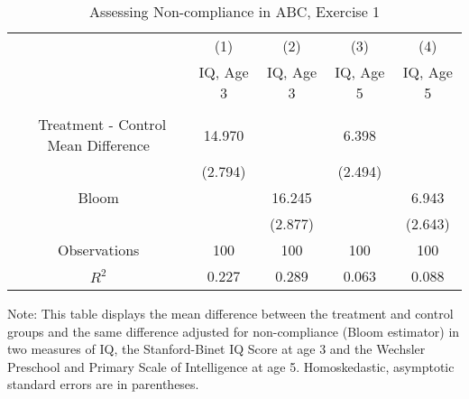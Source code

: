 \begin{table}[H] 
\begin{threeparttable}
\caption{Assessing Non-compliance in ABC, Exercise 1}
\label{table:nc1}
\centering 
\begin{tabular}{ccccc} \toprule
 & (1) & (2) & (3) & (4) \\
 & IQ, Age 3 & IQ, Age 3  & IQ, Age 5 & IQ, Age 5 \\ \midrule
 &  &  & & \\\
Treatment - Control Mean Difference & 14.970 &  & 6.398 &  \\
 & (2.794) &  & (2.494) &  \\
Bloom &  & 16.245 &  & 6.943 \\
 &  & (2.877) &  & (2.643) \\ \midrule
Observations & 100 & 100 & 100 & 100  \\
 $R^2$ & 0.227 & 0.289 & 0.063 & 0.088 \\ \bottomrule
 \end{tabular}
\begin{tablenotes}
\footnotesize
\item Note: This table displays the mean difference between the treatment and control groups and the same difference adjusted for non-compliance (Bloom estimator) in two measures of IQ, the Stanford-Binet IQ Score at age 3 and the Wechsler Preschool and Primary Scale of Intelligence at age 5. Homoskedastic, asymptotic standard errors are in parentheses.
\end{tablenotes}
\end{threeparttable}
\end{table}
